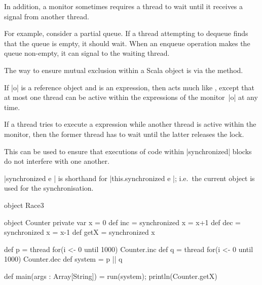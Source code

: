 
\begin{slide}

In addition, a monitor sometimes requires a thread to wait until it receives a
signal from another thread.  

For example, consider a partial queue.  If a thread attempting to dequeue
finds that the queue is empty, it should wait.  When an enqueue operation
makes the queue non-empty, it can signal to the waiting thread.
\end{slide}


\begin{slide}

The way to ensure mutual exclusion within a Scala object  is via the
 method.  

If |o| is a reference object and  is an expression, then
 acts much like , except that at most
one thread can be active within the  expressions of the
monitor~|o| at any time. 

If a thread tries to execute a 
expression while another thread is active within the monitor, then the former
thread has to wait until the latter releases the lock. 

This can be used to ensure that executions of code within
|synchronized| blocks do not interfere with one another. 

|synchronized{ e }| is shorthand for |this.synchronized{ e }|; i.e.~the
current object is used for the synchronisation.
\end{slide}


\begin{slide}

\begin{scala}
object Race3{
  object Counter{
    private var x = 0
    def inc = synchronized{ x = x+1 }
    def dec = synchronized{ x = x-1 }
    def getX = synchronized{ x }
  }

  def p = thread{ for(i <- 0 until 1000) Counter.inc }
  def q = thread{ for(i <- 0 until 1000) Counter.dec }
  def system = p || q

  def main(args : Array[String]) = { run(system); println(Counter.getX) }
}
\end{scala}
\end{slide}

